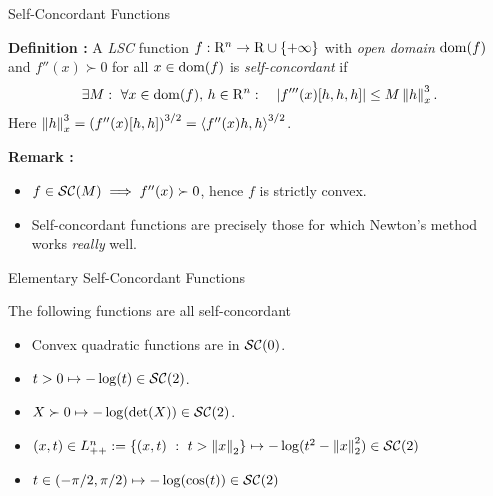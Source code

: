 \documentclass[9pt]{beamer}
\begin{document}
\begin{frame}{Self-Concordant Functions}

  \textbf{Definition :} A \emph{LSC} function $f : \mathrm{R}^n\to\mathrm{R}\cup\{+\infty\}$ with \emph{open domain} $\operatorname{dom}(f)$ and $f''(x)\succ 0$ for all $x\in\operatorname{dom}(f)$ is \emph{self-concordant} if
  \[
    \exists M : ~ \forall x\in\operatorname{dom}(f),\, h\in \mathrm{R}^n: \quad \left|f'''(x)[h, h, h]\right|\leq M \left\|h\right\|_x^3.
  \]
  Here $\left\|h\right\|_x^3 = \left(f''(x)[h, h]\right)^{3/2} = \left<f''(x) h, h\right>^{3/2}$.

  \vfill


  \vfill

  \textbf{Remark :}
  \begin{itemize}
  \item $f \in \mathcal{SC}(M) \implies f''(x) \succ 0$, hence $f$ is strictly convex.
  \item<2-> Self-concordant functions are precisely those for which Newton's method works \emph{really} well.
  \end{itemize}
  
\end{frame}

\begin{frame}{Elementary Self-Concordant Functions}

  The following functions are all self-concordant
  \begin{itemize}
    \setlength\itemsep{2em}
  \item Convex quadratic functions are in $\mathcal{SC}(0)$.
  \item $t>0 \mapsto -\log(t) \in \mathcal{SC}(2)$.
  \item $X\succ 0\mapsto -\log(\det(X)) \in \mathcal{SC}(2)$.
  \item<2-> $(x, t)\in L^n_{++}:=\left\{ (x, t)\ : \ t>\left\|x\right\|_2 \right\} \mapsto -\log(t^2-\left\|x\right\|^2_2) \in \mathcal{SC}(2)$
  \item<2-> $t\in(-\pi/2, \pi/2)\mapsto -\log(\cos(t)) \in \mathcal{SC}(2)$
  \end{itemize}
  
\end{frame}
\end{document}

